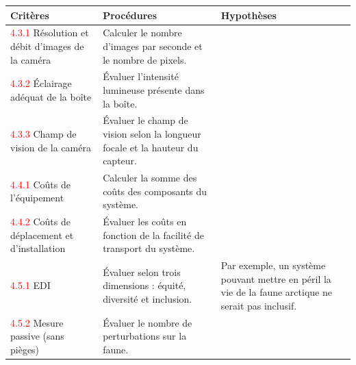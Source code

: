 \begin{table}[H]
  \centering
  \footnotesize
  \begin{tabular}{|p{3.6cm}|p{5.0cm}|p{5.0cm}|}
    \hline
    \textbf{Critères} & \textbf{Procédures} & \textbf{Hypothèses} \\
    \hline
    \textcolor{red}{4.3.1} Résolution et débit d’images de la caméra & Calculer le nombre d’images par seconde et le nombre de pixels. & \\
    \hline
    \textcolor{red}{4.3.2} Éclairage adéquat de la boîte & Évaluer l’intensité lumineuse présente dans la boîte. & \\
    \hline
    \textcolor{red}{4.3.3} Champ de vision de la caméra & Évaluer le champ de vision selon la longueur focale et la hauteur du capteur. & \\
    \hline
    \textcolor{red}{4.4.1} Coûts de l’équipement & Calculer la somme des coûts des composants du système. & \\
    \hline
    \textcolor{red}{4.4.2} Coûts de déplacement et d’installation & Évaluer les coûts en fonction de la facilité de transport du système. & \\
    \hline
    \textcolor{red}{4.5.1} EDI & Évaluer selon trois dimensions : équité, diversité et inclusion. & Par exemple, un système pouvant mettre en péril la vie de la faune arctique ne serait pas inclusif. \\
    \hline
    \textcolor{red}{4.5.2} Mesure passive (sans pièges) & Évaluer le nombre de perturbations sur la faune. & \\
    \hline
  \end{tabular}
\end{table}
